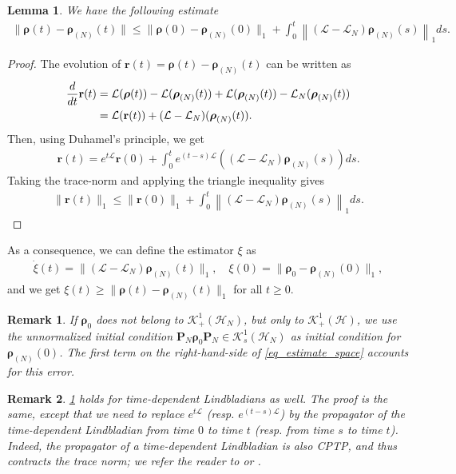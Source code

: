 \documentclass[a4paper,onecolumn,amsmath,amssymb,amsfonts,accepted=2026-03-06]{quantumarticle}
\newcommand{\xL}{\mathcal{L}}
\newcommand{\xH}{\mathcal{H}}
\newcommand{\xK}{\mathcal{K}}
\newcommand{\Proj}[1]{\mathbf{P}_{#1}}
\newcommand{\rN}{{\boldsymbol{\rho}_{(N)}}}
\newtheorem{lemma}{Lemma}
\newtheorem{remark}{Remark}
\begin{document}
\begin{lemma}
    \label{prop-aposteriori}
    We have the following estimate
    \begin{align}
        \label{eq_estimate_space}
        \|\boldsymbol{\rho}(t)-\rN(t)\| \leq \|\boldsymbol{\rho}(0)-\rN(0)\|_1 + \int_0^t \left\|\left(\xL-\xL_N\right) \rN(s)\right\|_1 ds.
    \end{align}
\end{lemma}
\begin{proof}
    The evolution of $\mathbf{r}(t)=\boldsymbol{\rho}(t)-\rN(t)$ can be written as
    \begin{align}
        \notag\frac{d}{dt}\mathbf{r}(t)&=\mathcal{L}(\boldsymbol{\rho}(t))-\mathcal{L}(\rN(t))+\mathcal{L}(\rN(t))-\mathcal{L}_N(\rN(t))\\
        \label{eq:errors}
        &=\mathcal{L}(\mathbf{r}(t))+(\mathcal{L}-\mathcal{L}_N)(\rN(t)).
    \end{align}
    Then, using Duhamel's principle, we get
    \begin{align}
        \label{eq-rt}
        \mathbf{r}(t)= e^{t\xL}\mathbf{r}(0) + \int_0^t  e^{(t-s)\xL} \left( \left(\xL-\xL_N\right) \rN(s)\right)ds.
    \end{align}
    Taking the trace-norm and applying the triangle inequality gives
    \begin{align}
        \|\mathbf{r}(t)\|_1 \leq  \|\mathbf{r}(0)\|_1 + \int_0^t  \left\|\left(\xL-\xL_N\right) \rN(s)\right\|_1 ds.
    \end{align}
\end{proof}
As a consequence, we can define the estimator $\xi$ as
\begin{align}
    \label{eq_estimator_xi}
    \dot \xi(t)= \|\left(\xL-\xL_N\right) \rN(t)\|_1, \quad \xi(0)= \| \boldsymbol{\rho}_0- \rN(0)\|_1,
\end{align}
and we get $\xi(t)\geq \|\boldsymbol{\rho}(t)-\rN(t)\|_1$ for all $t\geq 0$.
\begin{remark}
    \label{rmk:initial state}
   If $\boldsymbol{\rho}_0$ does not belong to $\xK^1_+(\xH_N)$, but only to $\xK^1_+(\xH)$, we use the unnormalized initial condition $\Proj{N}\boldsymbol{\rho}_0\Proj{N}\in \xK^1_s(\xH_N)$ as initial condition for $\rN(0)$. The first term on the right-hand-side of \cref{eq_estimate_space} accounts for this error.
\end{remark}

\begin{remark}
    \label{time:dependent}
   \cref{prop-aposteriori} holds for time-dependent Lindbladians as well. The proof is the same, except that we need to replace $e^{t\xL}$ (resp. $e^{(t-s)\xL}$) by the propagator of the time-dependent Lindbladian from time $0$ to time $t$ (resp. from time $s$ to time $t$). Indeed, the propagator of a time-dependent Lindbladian is also CPTP, and thus contracts the trace norm; we refer the reader to \cite[Theorem 3.5 and remark 3 after Theorem 2.11]{gondolfEnergyPreservingEvolutions2023} or \cite{article_chebo}.
\end{remark}
\end{document}
